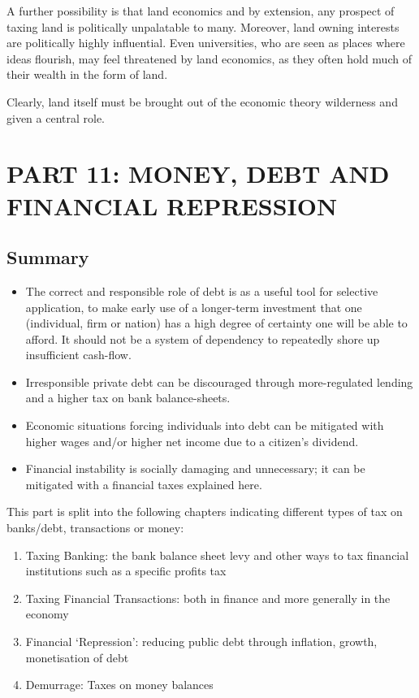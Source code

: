 \documentclass[]{tufte-handout}
\providecommand{\tightlist}{%
  \setlength{\itemsep}{0pt}\setlength{\parskip}{0pt}}
\begin{document}
A further possibility is that land economics and by extension, any
prospect of taxing land is politically unpalatable to many. Moreover,
land owning interests are politically highly influential. Even
universities, who are seen as places where ideas flourish, may feel
threatened by land economics, as they often hold much of their wealth in
the form of land.

Clearly, land itself must be brought out of the economic theory
wilderness and given a central role.

\newpage

\hypertarget{part-11-money-debt-and-financial-repression}{%
\section{PART 11: MONEY, DEBT AND FINANCIAL
REPRESSION}\label{part-11-money-debt-and-financial-repression}}

\hypertarget{summary-4}{%
\subsection{Summary}\label{summary-4}}

\begin{itemize}
\tightlist
\item
  The correct and responsible role of debt is as a useful tool for
  selective application, to make early use of a longer-term investment
  that one (individual, firm or nation) has a high degree of certainty
  one will be able to afford. It should not be a system of dependency to
  repeatedly shore up insufficient cash-flow.
\item
  Irresponsible private debt can be discouraged through more-regulated
  lending and a higher tax on bank balance-sheets.
\item
  Economic situations forcing individuals into debt can be mitigated
  with higher wages and/or higher net income due to a citizen's
  dividend.
\item
  Financial instability is socially damaging and unnecessary; it can be
  mitigated with a financial taxes explained here.
\end{itemize}

This part is split into the following chapters indicating different
types of tax on banks/debt, transactions or money:

\begin{enumerate}
\def\labelenumi{\arabic{enumi}.}
\tightlist
\item
  Taxing Banking: the bank balance sheet levy and other ways to tax
  financial institutions such as a specific profits tax
\item
  Taxing Financial Transactions: both in finance and more generally in
  the economy
\item
  Financial `Repression': reducing public debt through inflation,
  growth, monetisation of debt
\item
  Demurrage: Taxes on money balances
\end{enumerate}
\end{document}
